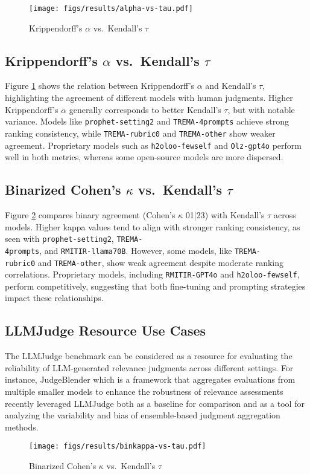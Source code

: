 \begin{figure}
    \centering
    \texttt{[image: figs/results/alpha-vs-tau.pdf]}
    \caption{Krippendorff's $\alpha$ vs.~Kendall's $\tau$}
    \label{fig:alpha-vs-tau}
\end{figure}

\subsection{Krippendorff's \texorpdfstring{$\alpha$}{alpha} vs.~Kendall's \texorpdfstring{$\tau$}{tau}}
Figure \ref{fig:alpha-vs-tau} shows the relation between Krippendorff's $\alpha$ and Kendall's $\tau$, highlighting the agreement of different models with human judgments. Higher Krippendorff's $\alpha$ generally corresponds to better Kendall’s $\tau$, but with notable variance. Models like \texttt{prophet-setting2} and \texttt{TREMA-4prompts} achieve strong ranking consistency, while \texttt{TREMA-rubric0} and \texttt{TREMA-other} show weaker agreement. Proprietary models such as \texttt{h2oloo-fewself} and \texttt{Olz-gpt4o} perform well in both metrics, whereas some open-source models are more dispersed.

\subsection{Binarized Cohen's $\kappa$ vs.~Kendall's $\tau$}
Figure \ref{fig:binkappa-vs-tau} compares binary agreement (Cohen's $\kappa$ 01|23) with Kendall's $\tau$ across models. Higher kappa values tend to align with stronger ranking consistency, as seen with \texttt{prophet-setting2}, \texttt{TREMA-\\4prompts}, and \texttt{RMITIR-llama70B}. However, some models, like \texttt{TREMA-\\rubric0} and \texttt{TREMA-other}, show weak agreement despite moderate ranking correlations. Proprietary models, including \texttt{RMITIR-GPT4o} and \texttt{h2oloo-fewself}, perform competitively, suggesting that both fine-tuning and prompting strategies impact these relationships.

\subsection{LLMJudge Resource Use Cases}
The LLMJudge benchmark can be considered as a resource for evaluating the reliability of LLM-generated relevance judgments across different settings. For instance, JudgeBlender \cite{rahmani2024judgeblender} which is a framework that aggregates evaluations from multiple smaller models to enhance the robustness of relevance assessments recently leveraged LLMJudge both as a baseline for comparison and as a tool for analyzing the variability and bias of ensemble-based judgment aggregation methods.

\begin{figure}
    \centering
    \texttt{[image: figs/results/binkappa-vs-tau.pdf]}
    \caption{Binarized Cohen's $\kappa$ vs.~Kendall's $\tau$}
    \label{fig:binkappa-vs-tau}
\end{figure}